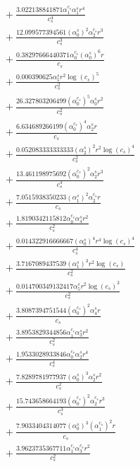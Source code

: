 \documentclass[10pt]{article}
\begin{document}
\begin{align*}
&{}  + \frac{3.022138841871 \alpha_{1}^{c_s} \alpha_{1}^s r^{4}}{c_{s}^{4}} \\
&{}  + \frac{12.099577394561 \left(\alpha_{0}^s\right)^{2} \alpha_{2}^{c_s} r^{3}}{c_{s}^{3}} \\
&{}  + \frac{0.38297666440371 \alpha_{0}^{c_s} \left(\alpha_{0}^s\right)^{6} r}{c_{s}} \\
&{}  + \frac{0.000390625 \alpha_{5}^s r^{2} \log{\left(c_{s} \right)}^{5}}{c_{s}^{2}} \\
&{}  + \frac{26.327803206499 \left(\alpha_{0}^{c_s}\right)^{5} \alpha_{0}^s r^{2}}{c_{s}^{2}} \\
&{}  + \frac{6.634689266199 \left(\alpha_{0}^{c_s}\right)^{4} \alpha_{2}^s r}{c_{s}} \\
&{}  + \frac{0.052083333333333 \left(\alpha_{2}^s\right)^{2} r^{2} \log{\left(c_{s} \right)}^{4}}{c_{s}^{2}} \\
&{}  + \frac{13.461198975692 \left(\alpha_{0}^{c_s}\right)^{2} \alpha_{2}^s r^{3}}{c_{s}^{3}} \\
&{}  + \frac{7.0515938350233 \left(\alpha_{1}^s\right)^{2} \alpha_{2}^{c_s} r}{c_{s}} \\
&{}  + \frac{1.8190342115812 \alpha_{0}^{c_s} \alpha_{4}^s r^{2}}{c_{s}^{2}} \\
&{}  + \frac{0.014322916666667 \left(\alpha_{0}^s\right)^{4} r^{4} \log{\left(c_{s} \right)}^{4}}{c_{s}^{4}} \\
&{}  + \frac{3.7167089437539 \left(\alpha_{1}^s\right)^{3} r^{2} \log{\left(c_{s} \right)}}{c_{s}^{2}} \\
&{}  + \frac{0.014700349132417 \alpha_{5}^s r^{2} \log{\left(c_{s} \right)}^{3}}{c_{s}^{2}} \\
&{}  + \frac{3.8087394751544 \left(\alpha_{0}^{c_s}\right)^{2} \alpha_{4}^s r}{c_{s}} \\
&{}  + \frac{3.8953829344856 \alpha_{1}^{c_s} \alpha_{3}^s r^{2}}{c_{s}^{2}} \\
&{}  + \frac{1.9533028933846 \alpha_{0}^{c_s} \alpha_{2}^s r^{4}}{c_{s}^{4}} \\
&{}  + \frac{7.8289781977937 \left(\alpha_{0}^s\right)^{3} \alpha_{2}^s r^{2}}{c_{s}^{2}} \\
&{}  + \frac{15.743658664193 \left(\alpha_{0}^{c_s}\right)^{2} \alpha_{2}^{c_s} r^{3}}{c_{s}^{3}} \\
&{}  + \frac{7.9033404314077 \left(\alpha_{0}^s\right)^{3} \left(\alpha_{1}^{c_s}\right)^{2} r}{c_{s}} \\
&{}  + \frac{3.9623735367711 \alpha_{1}^{c_s} \alpha_{3}^{c_s} r^{2}}{c_{s}^{2}} \\

\end{align*}
\end{document}
